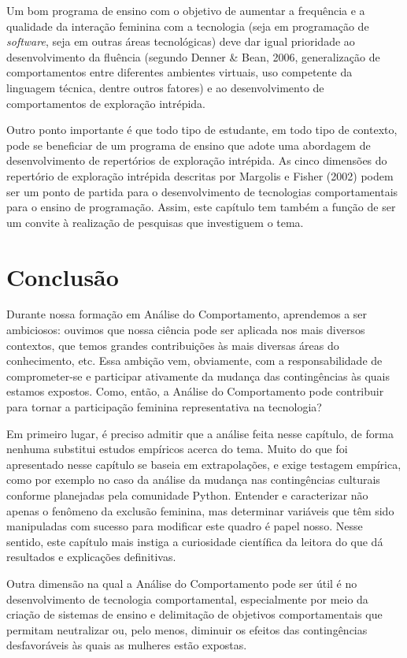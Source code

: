 Um bom programa de ensino com o objetivo de aumentar a frequência e a qualidade da interação feminina com a tecnologia (seja em programação de \textit{software}, seja em outras áreas tecnológicas) deve dar igual prioridade ao desenvolvimento da fluência (segundo Denner \& Bean, 2006, generalização de comportamentos entre diferentes ambientes virtuais, uso competente da linguagem técnica, dentre outros fatores) e ao desenvolvimento de comportamentos de exploração intrépida.

Outro ponto importante é que todo tipo de estudante, em todo tipo de contexto, pode se beneficiar de um programa de ensino que adote uma abordagem de desenvolvimento de repertórios de exploração intrépida. As cinco dimensões do repertório de exploração intrépida descritas por Margolis e Fisher (2002) podem ser um ponto de partida para o desenvolvimento de tecnologias comportamentais para o ensino de programação. Assim, este capítulo tem também a função de ser um convite à realização de pesquisas que investiguem o tema. 

\section*{Conclusão}

Durante nossa formação em Análise do Comportamento, aprendemos a ser ambiciosos: ouvimos que nossa ciência pode ser aplicada nos mais diversos contextos, que temos grandes contribuições às mais diversas áreas do conhecimento, etc. Essa ambição vem, obviamente, com a responsabilidade de comprometer-se e participar ativamente da mudança das contingências às quais estamos expostos. Como, então, a Análise do Comportamento pode contribuir para tornar a participação feminina representativa na tecnologia? 

Em primeiro lugar, é preciso admitir que a análise feita nesse capítulo, de forma nenhuma substitui estudos empíricos acerca do tema. Muito do que foi apresentado nesse capítulo se baseia em extrapolações, e exige testagem empírica, como por exemplo no caso da análise da mudança nas contingências culturais conforme planejadas pela comunidade Python. Entender e caracterizar não apenas o fenômeno da exclusão feminina, mas determinar variáveis que têm sido manipuladas com sucesso para modificar este quadro é papel nosso. Nesse sentido, este capítulo mais instiga a curiosidade científica da leitora do que dá resultados e explicações definitivas.

Outra dimensão na qual a Análise do Comportamento pode ser útil é no desenvolvimento de tecnologia comportamental, especialmente por meio da criação de sistemas de ensino e delimitação de objetivos comportamentais que permitam neutralizar ou, pelo menos, diminuir os efeitos das contingências desfavoráveis às quais as mulheres estão expostas.

